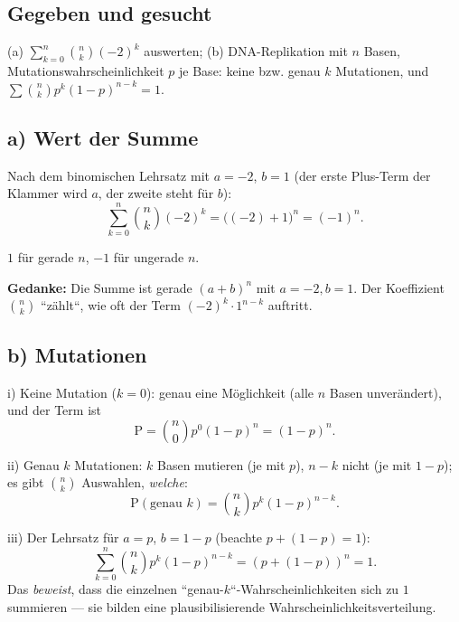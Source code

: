 

\subsection*{Gegeben und gesucht}
(a) $\sum_{k=0}^{n}\binom{n}{k}(-2)^k$ auswerten; (b) DNA-Replikation mit
$n$ Basen, Mutationswahrscheinlichkeit $p$ je Base: keine bzw. genau $k$
Mutationen, und $\sum\binom{n}{k}p^k(1-p)^{n-k}=1$.

\subsection*{a) Wert der Summe}
Nach dem binomischen Lehrsatz mit $a=-2$, $b=1$ (der erste Plus-Term der
Klammer wird $a$, der zweite steht für $b$):
\begin{equation}
  \sum_{k=0}^{n}\binom{n}{k}(-2)^k=\bigl((-2)+1\bigr)^n=(-1)^n .
\end{equation}
\begin{ergebnis}
$1$ für gerade $n$, $-1$ für ungerade $n$.
\end{ergebnis}
\textbf{Gedanke:} Die Summe ist gerade $(a+b)^n$ mit $a=-2,b=1$. Der
Koeffizient $\binom{n}{k}$ ``zählt``, wie oft der Term $(-2)^k\cdot1^{n-k}$
auftritt.

\subsection*{b) Mutationen}
i) Keine Mutation ($k=0$): genau eine Möglichkeit (alle $n$ Basen
unverändert), und der Term ist
\begin{equation}
  \mathrm P=\binom{n}{0}p^0(1-p)^n=(1-p)^n .
\end{equation}

ii) Genau $k$ Mutationen: $k$ Basen mutieren (je mit $p$), $n-k$ nicht
(je mit $1-p$); es gibt $\binom{n}{k}$ Auswahlen, \emph{welche}:
\begin{equation}
  \mathrm P(\text{genau }k)=\binom{n}{k}p^k(1-p)^{n-k}.
\end{equation}

iii) Der Lehrsatz für $a=p$, $b=1-p$ (beachte $p+(1-p)=1$):
\begin{equation}
  \sum_{k=0}^{n}\binom{n}{k}p^k(1-p)^{n-k}=(p+(1-p))^n=1 .
\end{equation}
Das \emph{beweist}, dass die einzelnen ``genau-$k$``-Wahrscheinlichkeiten
sich zu $1$ summieren --- sie bilden eine plausibilisierende
Wahrscheinlichkeitsverteilung.

